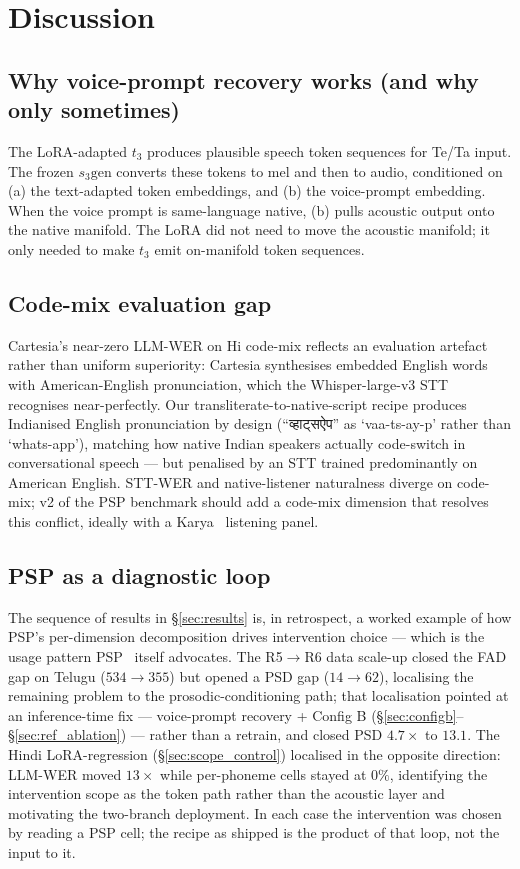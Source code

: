 \documentclass[conference,a4paper]{IEEEtran}
\newcommand{\texthi}[1]{{\devanagarifont #1}}
\newcommand{\psp}{\textsc{PSP}}
\newcommand{\configb}{Config B}
\begin{document}
\section{Discussion}
\label{sec:discussion}

\subsection{Why voice-prompt recovery works (and why only sometimes)}
The LoRA-adapted $t_3$ produces plausible speech token sequences for Te/Ta input. The frozen $s_3\text{gen}$ converts these tokens to mel and then to audio, conditioned on (a) the text-adapted token embeddings, and (b) the voice-prompt embedding. When the voice prompt is same-language native, (b) pulls acoustic output onto the native manifold. The LoRA did not need to move the acoustic manifold; it only needed to make $t_3$ emit on-manifold token sequences.

\subsection{Code-mix evaluation gap}
\label{sec:codemix_eval_gap}
Cartesia's near-zero LLM-WER on Hi code-mix reflects an evaluation artefact rather than uniform superiority: Cartesia synthesises embedded English words with American-English pronunciation, which the Whisper-large-v3 STT recognises near-perfectly. Our transliterate-to-native-script recipe produces Indianised English pronunciation by design (``\texthi{व्हाट्सऐप}'' as `vaa-ts-ay-p' rather than `whats-app'), matching how native Indian speakers actually code-switch in conversational speech --- but penalised by an STT trained predominantly on American English. STT-WER and native-listener naturalness diverge on code-mix; v2 of the \psp{} benchmark should add a code-mix dimension that resolves this conflict, ideally with a Karya~\cite{karya2025} listening panel.

\subsection{\psp{} as a diagnostic loop}
\label{sec:psp_diagnostic}
The sequence of results in §\ref{sec:results} is, in retrospect, a worked example of how \psp's per-dimension decomposition drives intervention choice --- which is the usage pattern \psp{}~\cite{psp2026} itself advocates. The R5$\to$R6 data scale-up closed the FAD gap on Telugu ($534 \to 355$) but opened a PSD gap ($14 \to 62$), localising the remaining problem to the prosodic-conditioning path; that localisation pointed at an inference-time fix --- voice-prompt recovery + \configb{} (§\ref{sec:configb}--§\ref{sec:ref_ablation}) --- rather than a retrain, and closed PSD $4.7\times$ to $13.1$. The Hindi LoRA-regression (§\ref{sec:scope_control}) localised in the opposite direction: LLM-WER moved $13\times$ while per-phoneme cells stayed at $0\%$, identifying the intervention scope as the token path rather than the acoustic layer and motivating the two-branch deployment. In each case the intervention was chosen by reading a \psp{} cell; the recipe as shipped is the product of that loop, not the input to it.
\end{document}
